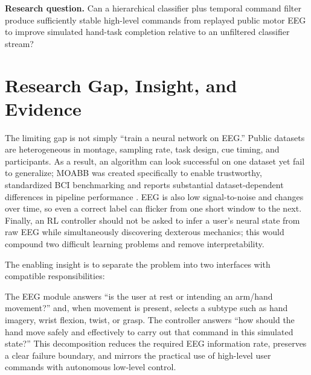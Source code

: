 \documentclass[11pt]{article}
\begin{document}
\textbf{Research question.} Can a hierarchical classifier plus temporal command filter produce sufficiently stable high-level commands from replayed public motor EEG to improve simulated hand-task completion relative to an unfiltered classifier stream?

\section{Research Gap, Insight, and Evidence}
The limiting gap is not simply ``train a neural network on EEG.'' Public datasets are heterogeneous in montage, sampling rate, task design, cue timing, and participants. As a result, an algorithm can look successful on one dataset yet fail to generalize; MOABB was created specifically to enable trustworthy, standardized BCI benchmarking and reports substantial dataset-dependent differences in pipeline performance \citep{jayaram2018}. EEG is also low signal-to-noise and changes over time, so even a correct label can flicker from one short window to the next. Finally, an RL controller should not be asked to infer a user's neural state from raw EEG while simultaneously discovering dexterous mechanics; this would compound two difficult learning problems and remove interpretability.

The enabling insight is to separate the problem into two interfaces with compatible responsibilities:

\begin{center}
\end{center}

The EEG module answers ``is the user at rest or intending an arm/hand movement?'' and, when movement is present, selects a subtype such as hand imagery, wrist flexion, twist, or grasp. The controller answers ``how should the hand move safely and effectively to carry out that command in this simulated state?'' This decomposition reduces the required EEG information rate, preserves a clear failure boundary, and mirrors the practical use of high-level user commands with autonomous low-level control.
\end{document}
